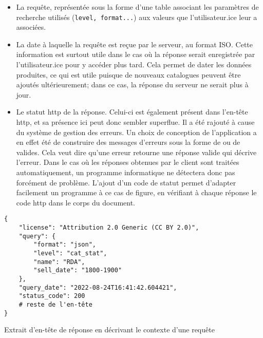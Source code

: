 \begin{itemize}
	\item La requête, représentée sous la forme d'une table associant les paramètres de recherche utilisés (\texttt{level, format...}) aux valeurs que l'utilisateur.ice leur a associées.
	\item La date à laquelle la requête est reçue par le serveur, au format ISO. Cette information est surtout utile dans le cas où la réponse serait enregistrée par l'utilisateur.ice pour y accéder plus tard. Cela permet de dater les données produites, ce qui est utile puisque de nouveaux catalogues peuvent être ajoutés ultérieurement; dans ce cas, la réponse du serveur ne serait plus à jour.
	\item Le statut \gls{http} de la réponse. Celui-ci est également présent dans l'en-tête \gls{http}, et sa présence ici peut donc sembler superflue. Il a été rajouté à cause du système de gestion des erreurs. Un choix de conception de l'application a en effet été de construire des messages d'erreurs sous la forme de \json{} ou de \tei{} valides. Cela veut dire qu'une erreur retourne une réponse valide qui décrive l'erreur. Dans le cas où les réponses obtenues par le client sont traitées automatiquement, un programme informatique ne détectera donc pas forcément de problème. L'ajout d'un code de statut permet d'adapter facilement un programme à ce cas de figure, en vérifiant à chaque réponse le code \gls{http} dans le corps du document.
\end{itemize}

\begin{listing}
	\begin{verbatim}
{
	"license": "Attribution 2.0 Generic (CC BY 2.0)",
	"query": {
		"format": "json",
		"level": "cat_stat",
		"name": "RDA",
		"sell_date": "1800-1900"
	},
	"query_date": "2022-08-24T16:41:42.604421",
	"status_code": 200
	# reste de l'en-tête
}
	\end{verbatim}
	\caption{Extrait d'en-tête de réponse en \json{} décrivant le contexte d'une requête}
	\label{code:api_header_context_json}
\end{listing}

